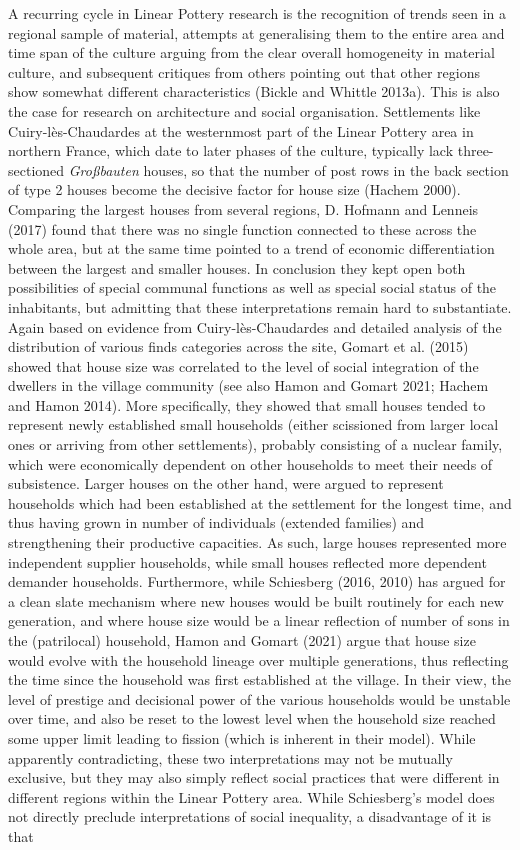 \documentclass[
  12pt,
  a4paper, twoside]{book}
\begin{document}
A recurring cycle in Linear Pottery research is the recognition of trends seen in a regional sample of material, attempts at generalising them to the entire area and time span of the culture arguing from the clear overall homogeneity in material culture, and subsequent critiques from others pointing out that other regions show somewhat different characteristics (Bickle and Whittle 2013a). This is also the case for research on architecture and social organisation. Settlements like Cuiry-lès-Chaudardes at the westernmost part of the Linear Pottery area in northern France, which date to later phases of the culture, typically lack three-sectioned \emph{Großbauten} houses, so that the number of post rows in the back section of type 2 houses become the decisive factor for house size (Hachem 2000). Comparing the largest houses from several regions, D. Hofmann and Lenneis (2017) found that there was no single function connected to these across the whole area, but at the same time pointed to a trend of economic differentiation between the largest and smaller houses. In conclusion they kept open both possibilities of special communal functions as well as special social status of the inhabitants, but admitting that these interpretations remain hard to substantiate. Again based on evidence from Cuiry-lès-Chaudardes and detailed analysis of the distribution of various finds categories across the site, Gomart et al. (2015) showed that house size was correlated to the level of social integration of the dwellers in the village community (see also Hamon and Gomart 2021; Hachem and Hamon 2014). More specifically, they showed that small houses tended to represent newly established small households (either scissioned from larger local ones or arriving from other settlements), probably consisting of a nuclear family, which were economically dependent on other households to meet their needs of subsistence. Larger houses on the other hand, were argued to represent households which had been established at the settlement for the longest time, and thus having grown in number of individuals (extended families) and strengthening their productive capacities. As such, large houses represented more independent supplier households, while small houses reflected more dependent demander households. Furthermore, while Schiesberg (2016, 2010) has argued for a clean slate mechanism where new houses would be built routinely for each new generation, and where house size would be a linear reflection of number of sons in the (patrilocal) household, Hamon and Gomart (2021) argue that house size would evolve with the household lineage over multiple generations, thus reflecting the time since the household was first established at the village. In their view, the level of prestige and decisional power of the various households would be unstable over time, and also be reset to the lowest level when the household size reached some upper limit leading to fission (which is inherent in their model). While apparently contradicting, these two interpretations may not be mutually exclusive, but they may also simply reflect social practices that were different in different regions within the Linear Pottery area. While Schiesberg's model does not directly preclude interpretations of social inequality, a disadvantage of it is that 
\end{document}
